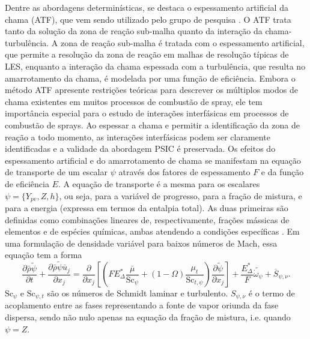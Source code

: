 Dentre as abordagens determinísticas, se destaca o espessamento artificial da chama (ATF), que vem sendo utilizado pelo grupo de pesquisa \cite{SacomanoF2017PhD,SacomanoF2017CF,SacomanoF2020CF}.
O ATF trata tanto da solução da zona de reação sub-malha quanto da interação da chama-turbulência. 
A zona de reação sub-malha é tratada com o espessamento artificial, que permite a resolução da zona de reação em malhas de resolução típicas de LES, enquanto a interação da chama espessada com a turbulência, que resulta no amarrotamento da chama, é modelada por uma função de eficiência. 
Embora o método ATF apresente restrições teóricas para descrever os múltiplos modos de chama existentes em muitos processos de combustão de spray, ele tem importância especial para o estudo de interações interfásicas em processos de combustão de sprays. 
Ao espessar a chama e permitir a identificação da zona de reação a todo momento, as interações interfásicas podem ser claramente identificadas e a validade da abordagem PSIC é preservada.
Os efeitos do espessamento artificial e do amarrotamento de chama se manifestam na equação de transporte de um escalar $\psi$ através dos fatores de espessamento $F$ e da função de eficiência $E$.
A equação de transporte é a mesma para os escalares  $\psi=\lbrace Y_{pv}, Z, h\rbrace$, ou seja, para a variável de progresso, para a fração de mistura, e para a energia (expressa em termos da entalpia total). As duas primeiras são definidas como combinações lineares de, respectivamente, frações mássicas de elementos e de espécies químicas, ambas atendendo a condições específicas \cite{PoinsotVeynante2005,vanOijen2016PECS}.
Em uma formulação de densidade variável para baixos números de Mach, essa equação tem a forma
\begin{equation}
    \frac{\partial \bar \rho \widetilde \psi}{\partial t} + 
    \frac{\partial \bar \rho \widetilde \psi \overline u_j}{\partial x_j} =
    \frac{\partial }{\partial x_j} \left[ \left(
    FE^*_\Delta \frac{\bar\mu}{\text{Sc}_\psi} + (1-\Omega)\frac{\mu_t}{\text{Sc}_{t,\psi}}
    \right) \frac{\partial \widetilde \psi}{\partial x_j}
    \right] +
    \frac{E^*_\Delta}{F}\widetilde{\dot{\omega}_\psi} + 
    \overline S_{\psi,\nu}.
    \label{eq:FGM}
\end{equation}
$\text{Sc}_{\psi}$ e $\text{Sc}_{\psi,t}$ são os números de Schmidt laminar e turbulento.
$S_{\psi,\nu}$ é o termo de acoplamento entre as fases representando a fonte de vapor oriunda da fase dispersa, sendo não nulo apenas na equação da fração de mistura, i.e. quando $\psi=Z$.

